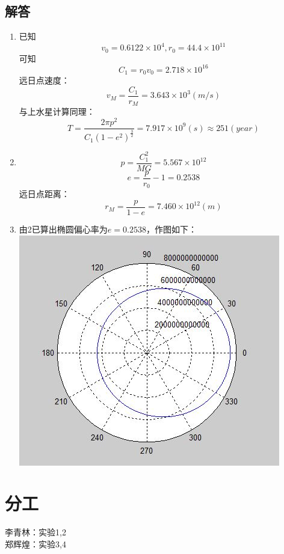 \documentclass[12pt]{article}
\begin{document}
\begin{CJK*}{UTF8}{gbsn}
\subsection*{解答}
\begin{enumerate}
\item
已知
$$v_{0} = 0.6122\times10^{4},r_{0} = 44.4\times10^{11}$$
可知
$$C_{1} = r_{0}v_{0} = 2.718\times10^{16}$$
远日点速度：
$$v_{M} = \frac{C_{1}}{r_{M}} = 3.643\times10^{3}(m/s)$$
与上水星计算同理：
$$T = \frac{2\pi p^{2}}{C_{1}(1-e^{2})^{\frac{3}{2}}} = 7.917\times10^{9}(s) \approx 251(year)$$
\item
$$p = \frac{C_{1}^{2}}{MG} = 5.567\times10^{12}$$
$$e = \frac{p}{r_{0}} - 1 = 0.2538$$
远日点距离：
$$r_{M} = \frac{p}{1-e} = 7.460\times10^{12}(m)$$
\item
由2已算出椭圆偏心率为$e = 0.2538$，作图如下：\\
\includegraphics[scale=1]{Q4_3.jpg}
\end{enumerate}
\section{分工}
李青林：实验1,2\\
郑辉煌：实验3,4\\

\end{CJK*}
\end{document}
